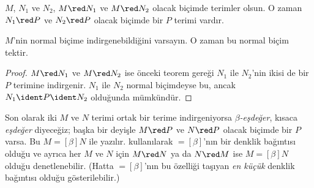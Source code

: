 


\begin{thm}
$M$, $N_1$ ve $N_2$, $M\red N_1$ ve $M\red N_2$ olacak biçimde terimler
olsun. O zaman $N_1\red P$ ve $N_2\red P$ olacak biçimde bir $P$ terimi
vardır.
\end{thm}

\begin{cor}
$M$'nin normal biçime indirgenebildiğini varsayın. O zaman bu normal biçim
tektir.
\end{cor}

\begin{proof}
$M\red N_1$ ve $M\red N_2$ ise önceki teorem gereği $N_1$ ile $N_2$'nin
ikisi de bir $P$ terimine indirgenir. $N_1$ ile $N_2$ normal biçimdeyse bu,
ancak $N_1\ident P\ident N_2$ olduğunda mümkündür.
\end{proof}

Son olarak iki $M$ ve $N$ terimi ortak bir terime indirgeniyorsa
\emph{$\beta$-eşdeğer}, kısaca \emph{eşdeğer} diyeceğiz; başka bir deyişle
$M\red P$ ve $N\red P$ olacak biçimde bir $P$ varsa. Bu $M\equal[\beta]N$
ile yazılır.  kullanılarak $\equal[\beta]$'nın bir
denklik bağıntısı olduğu ve ayrıca her $M$ ve $N$ için $M\red N$ ya da
$N\red M$ ise $M\equal[\beta]N$ olduğu denetlenebilir. (Hatta
$\equal[\beta]$'nın bu özelliği taşıyan \emph{en küçük} denklik bağıntısı
olduğu gösterilebilir.)

